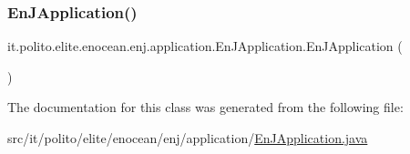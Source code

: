 \subsubsection{\texorpdfstring{En\+J\+Application()}{EnJApplication()}}
{\footnotesize\ttfamily it.\+polito.\+elite.\+enocean.\+enj.\+application.\+En\+J\+Application.\+En\+J\+Application (\begin{DoxyParamCaption}{ }\end{DoxyParamCaption})}



The documentation for this class was generated from the following file\+:\begin{DoxyCompactItemize}
\item 
src/it/polito/elite/enocean/enj/application/\hyperlink{_en_j_application_8java}{En\+J\+Application.\+java}\end{DoxyCompactItemize}
